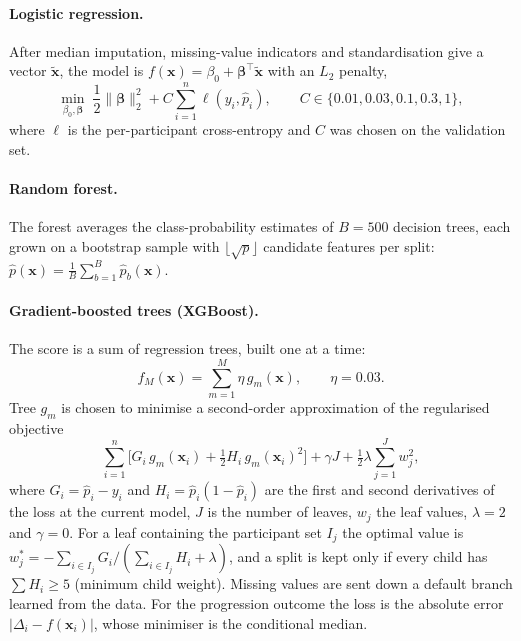 \paragraph{Logistic regression.} After median imputation, missing-value indicators and standardisation give a vector $\tilde{\mathbf{x}}$, the model is $f(\mathbf{x}) = \beta_0 + \boldsymbol{\beta}^{\top}\tilde{\mathbf{x}}$ with an $L_2$ penalty,
\begin{equation}
\min_{\beta_0, \boldsymbol{\beta}} \; \frac{1}{2}\lVert \boldsymbol{\beta} \rVert_2^2 + C \sum_{i=1}^{n} \ell(y_i, \hat{p}_i), \qquad C \in \{0.01, 0.03, 0.1, 0.3, 1\},
\end{equation}
where $\ell$ is the per-participant cross-entropy and $C$ was chosen on the validation set.

\paragraph{Random forest.} The forest averages the class-probability estimates of $B = 500$ decision trees, each grown on a bootstrap sample with $\lfloor\sqrt{p}\rfloor$ candidate features per split: $\hat{p}(\mathbf{x}) = \frac{1}{B}\sum_{b=1}^{B} \hat{p}_b(\mathbf{x})$.

\paragraph{Gradient-boosted trees (XGBoost).} The score is a sum of regression trees, built one at a time:
\begin{equation}
f_M(\mathbf{x}) = \sum_{m=1}^{M} \eta\, g_m(\mathbf{x}), \qquad \eta = 0.03.
\end{equation}
Tree $g_m$ is chosen to minimise a second-order approximation of the regularised objective
\begin{equation}
\sum_{i=1}^{n} \Big[ G_i\, g_m(\mathbf{x}_i) + \tfrac{1}{2} H_i\, g_m(\mathbf{x}_i)^2 \Big] + \gamma J + \tfrac{1}{2}\lambda \sum_{j=1}^{J} w_j^2,
\end{equation}
where $G_i = \hat{p}_i - y_i$ and $H_i = \hat{p}_i(1 - \hat{p}_i)$ are the first and second derivatives of the loss at the current model, $J$ is the number of leaves, $w_j$ the leaf values, $\lambda = 2$ and $\gamma = 0$. For a leaf containing the participant set $I_j$ the optimal value is $w_j^{*} = -\sum_{i \in I_j} G_i / (\sum_{i \in I_j} H_i + \lambda)$, and a split is kept only if every child has $\sum H_i \ge 5$ (minimum child weight). Missing values are sent down a default branch learned from the data. For the progression outcome the loss is the absolute error $\lvert \Delta_i - f(\mathbf{x}_i) \rvert$, whose minimiser is the conditional median.

